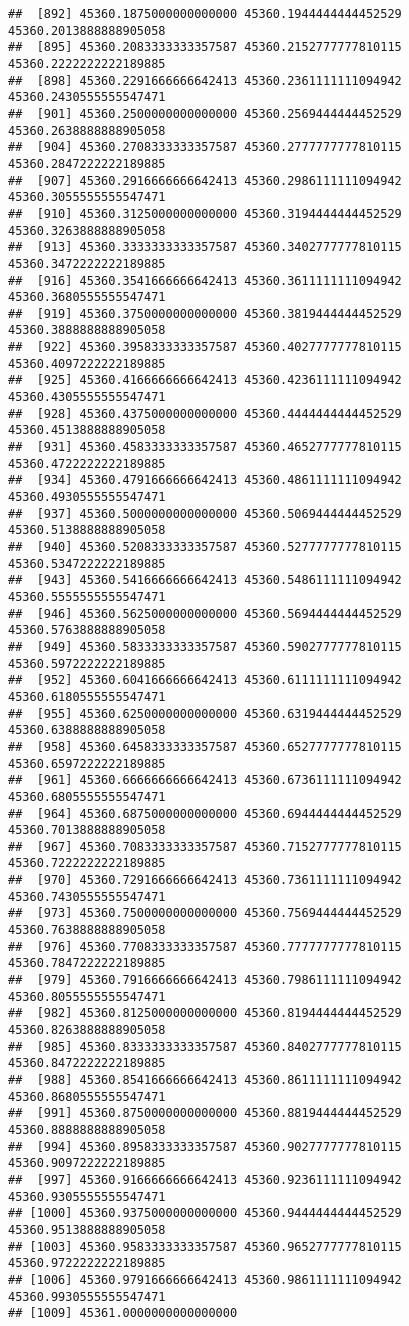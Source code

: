 \documentclass[
]{article}
\begin{document}
\begin{verbatim}
##  [892] 45360.1875000000000000 45360.1944444444452529 45360.2013888888905058
##  [895] 45360.2083333333357587 45360.2152777777810115 45360.2222222222189885
##  [898] 45360.2291666666642413 45360.2361111111094942 45360.2430555555547471
##  [901] 45360.2500000000000000 45360.2569444444452529 45360.2638888888905058
##  [904] 45360.2708333333357587 45360.2777777777810115 45360.2847222222189885
##  [907] 45360.2916666666642413 45360.2986111111094942 45360.3055555555547471
##  [910] 45360.3125000000000000 45360.3194444444452529 45360.3263888888905058
##  [913] 45360.3333333333357587 45360.3402777777810115 45360.3472222222189885
##  [916] 45360.3541666666642413 45360.3611111111094942 45360.3680555555547471
##  [919] 45360.3750000000000000 45360.3819444444452529 45360.3888888888905058
##  [922] 45360.3958333333357587 45360.4027777777810115 45360.4097222222189885
##  [925] 45360.4166666666642413 45360.4236111111094942 45360.4305555555547471
##  [928] 45360.4375000000000000 45360.4444444444452529 45360.4513888888905058
##  [931] 45360.4583333333357587 45360.4652777777810115 45360.4722222222189885
##  [934] 45360.4791666666642413 45360.4861111111094942 45360.4930555555547471
##  [937] 45360.5000000000000000 45360.5069444444452529 45360.5138888888905058
##  [940] 45360.5208333333357587 45360.5277777777810115 45360.5347222222189885
##  [943] 45360.5416666666642413 45360.5486111111094942 45360.5555555555547471
##  [946] 45360.5625000000000000 45360.5694444444452529 45360.5763888888905058
##  [949] 45360.5833333333357587 45360.5902777777810115 45360.5972222222189885
##  [952] 45360.6041666666642413 45360.6111111111094942 45360.6180555555547471
##  [955] 45360.6250000000000000 45360.6319444444452529 45360.6388888888905058
##  [958] 45360.6458333333357587 45360.6527777777810115 45360.6597222222189885
##  [961] 45360.6666666666642413 45360.6736111111094942 45360.6805555555547471
##  [964] 45360.6875000000000000 45360.6944444444452529 45360.7013888888905058
##  [967] 45360.7083333333357587 45360.7152777777810115 45360.7222222222189885
##  [970] 45360.7291666666642413 45360.7361111111094942 45360.7430555555547471
##  [973] 45360.7500000000000000 45360.7569444444452529 45360.7638888888905058
##  [976] 45360.7708333333357587 45360.7777777777810115 45360.7847222222189885
##  [979] 45360.7916666666642413 45360.7986111111094942 45360.8055555555547471
##  [982] 45360.8125000000000000 45360.8194444444452529 45360.8263888888905058
##  [985] 45360.8333333333357587 45360.8402777777810115 45360.8472222222189885
##  [988] 45360.8541666666642413 45360.8611111111094942 45360.8680555555547471
##  [991] 45360.8750000000000000 45360.8819444444452529 45360.8888888888905058
##  [994] 45360.8958333333357587 45360.9027777777810115 45360.9097222222189885
##  [997] 45360.9166666666642413 45360.9236111111094942 45360.9305555555547471
## [1000] 45360.9375000000000000 45360.9444444444452529 45360.9513888888905058
## [1003] 45360.9583333333357587 45360.9652777777810115 45360.9722222222189885
## [1006] 45360.9791666666642413 45360.9861111111094942 45360.9930555555547471
## [1009] 45361.0000000000000000
\end{verbatim}
\end{document}
